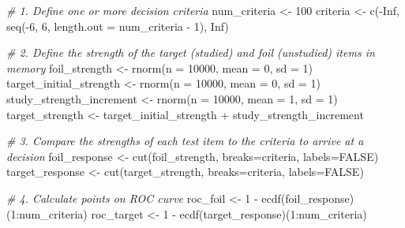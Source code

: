 \documentclass[
]{book}
\newenvironment{Shaded}{\begin{snugshade}}{\end{snugshade}}
\newcommand{\AttributeTok}[1]{\textcolor[rgb]{0.77,0.63,0.00}{#1}}
\newcommand{\CommentTok}[1]{\textcolor[rgb]{0.56,0.35,0.01}{\textit{#1}}}
\newcommand{\ConstantTok}[1]{\textcolor[rgb]{0.00,0.00,0.00}{#1}}
\newcommand{\DecValTok}[1]{\textcolor[rgb]{0.00,0.00,0.81}{#1}}
\newcommand{\FunctionTok}[1]{\textcolor[rgb]{0.00,0.00,0.00}{#1}}
\newcommand{\NormalTok}[1]{#1}
\newcommand{\OtherTok}[1]{\textcolor[rgb]{0.56,0.35,0.01}{#1}}
\newcommand{\SpecialCharTok}[1]{\textcolor[rgb]{0.00,0.00,0.00}{#1}}
\begin{document}
\begin{Shaded}
\begin{Highlighting}[]
\CommentTok{\# 1. Define one or more decision criteria}
\NormalTok{num\_criteria }\OtherTok{\textless{}{-}} \DecValTok{100}
\NormalTok{criteria }\OtherTok{\textless{}{-}} \FunctionTok{c}\NormalTok{(}\SpecialCharTok{{-}}\ConstantTok{Inf}\NormalTok{, }\FunctionTok{seq}\NormalTok{(}\SpecialCharTok{{-}}\DecValTok{6}\NormalTok{, }\DecValTok{6}\NormalTok{, }\AttributeTok{length.out =}\NormalTok{ num\_criteria }\SpecialCharTok{{-}} \DecValTok{1}\NormalTok{), }\ConstantTok{Inf}\NormalTok{)}

\CommentTok{\# 2. Define the strength of the target (studied) and foil (unstudied) items in memory}
\NormalTok{foil\_strength }\OtherTok{\textless{}{-}} \FunctionTok{rnorm}\NormalTok{(}\AttributeTok{n =} \DecValTok{10000}\NormalTok{, }\AttributeTok{mean =} \DecValTok{0}\NormalTok{, }\AttributeTok{sd =} \DecValTok{1}\NormalTok{)}
\NormalTok{target\_initial\_strength }\OtherTok{\textless{}{-}} \FunctionTok{rnorm}\NormalTok{(}\AttributeTok{n =} \DecValTok{10000}\NormalTok{, }\AttributeTok{mean =} \DecValTok{0}\NormalTok{, }\AttributeTok{sd =} \DecValTok{1}\NormalTok{)}
\NormalTok{study\_strength\_increment }\OtherTok{\textless{}{-}} \FunctionTok{rnorm}\NormalTok{(}\AttributeTok{n =} \DecValTok{10000}\NormalTok{, }\AttributeTok{mean =} \DecValTok{1}\NormalTok{, }\AttributeTok{sd =} \DecValTok{1}\NormalTok{)}
\NormalTok{target\_strength }\OtherTok{\textless{}{-}}\NormalTok{ target\_initial\_strength }\SpecialCharTok{+}\NormalTok{ study\_strength\_increment}

\CommentTok{\# 3. Compare the strengths of each test item to the criteria to arrive at a decision}
\NormalTok{foil\_response }\OtherTok{\textless{}{-}} \FunctionTok{cut}\NormalTok{(foil\_strength, }\AttributeTok{breaks=}\NormalTok{criteria, }\AttributeTok{labels=}\ConstantTok{FALSE}\NormalTok{)}
\NormalTok{target\_response }\OtherTok{\textless{}{-}} \FunctionTok{cut}\NormalTok{(target\_strength, }\AttributeTok{breaks=}\NormalTok{criteria, }\AttributeTok{labels=}\ConstantTok{FALSE}\NormalTok{)}

\CommentTok{\# 4. Calculate points on ROC curve}
\NormalTok{roc\_foil }\OtherTok{\textless{}{-}} \DecValTok{1} \SpecialCharTok{{-}} \FunctionTok{ecdf}\NormalTok{(foil\_response)(}\DecValTok{1}\SpecialCharTok{:}\NormalTok{num\_criteria)}
\NormalTok{roc\_target }\OtherTok{\textless{}{-}} \DecValTok{1} \SpecialCharTok{{-}} \FunctionTok{ecdf}\NormalTok{(target\_response)(}\DecValTok{1}\SpecialCharTok{:}\NormalTok{num\_criteria)}


\end{Highlighting}
\end{Shaded}
\end{document}

